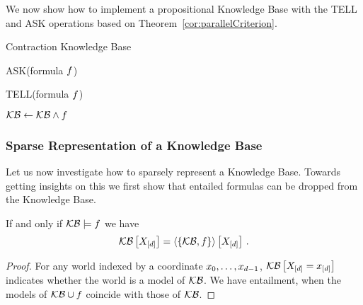 
We now show how to implement a propositional Knowledge Base with the TELL and ASK operations based on Theorem~\ref{cor:parallelCriterion}.

\begin{algorithm}[hbt!]
\caption{Contraction Knowledge Base}\label{alg:TensorKB}
ASK(formula $f$)
\begin{algorithmic}
	\State{$\hypercoreat{\formulavar} \leftarrow \sbcontractionof{\kb,\rencodingof{\exformula}}{\formulavar}$}
	\EndIf
	\EndIf
\end{algorithmic}
TELL(formula $f$)
\begin{algorithmic}
	\State $\mathcal{KB} \leftarrow \mathcal{KB}\land f$%
	\EndIf
\end{algorithmic}

\end{algorithm}




\subsubsection{Sparse Representation of a Knowledge Base}

Let us now investigate how to sparsely represent a Knowledge Base.
Towards getting insights on this we first show that entailed formulas can be dropped from the Knowledge Base.

\begin{theorem}\label{the:ReduncancyOfEntailed}
	If and only if $\mathcal{KB} \models f$ we have
		\[ \mathcal{KB}\left[X_{[d]}\right]= \left\langle \left\{\mathcal{KB},f\right\}\right\rangle \left[ X_{[d]} \right]  \, . \]
\end{theorem}
\begin{proof}
	For any world indexed by a coordinate ${x_{0},\ldots,x_{d-1}}$, $\mathcal{KB}\left[X_{[d]}=x_{[d]}\right]$ indicates whether the world is a model of $\mathcal{KB}$.
	We have entailment, when the models of $\mathcal{KB}\cup f$ coincide with those of $\mathcal{KB}$.
\end{proof}


